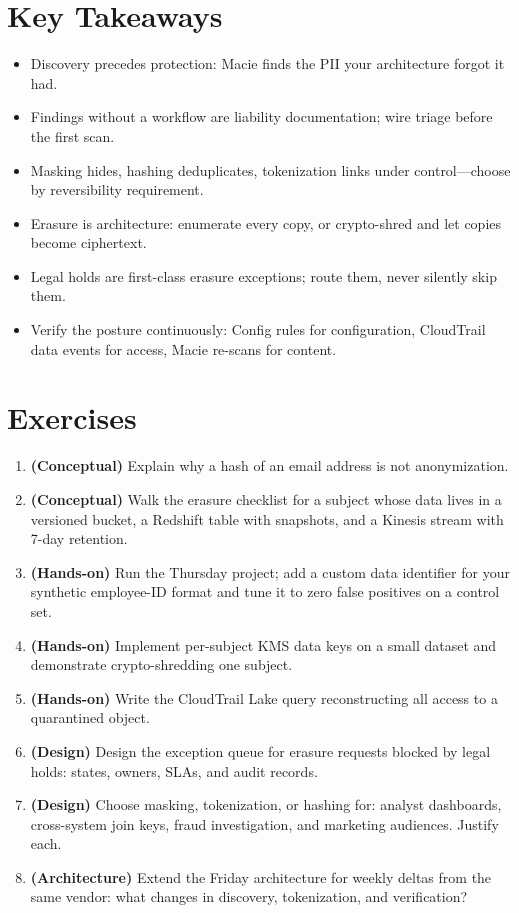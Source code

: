 \section*{Key Takeaways}
\begin{itemize}
    \item Discovery precedes protection: Macie finds the PII your architecture forgot it had.
    \item Findings without a workflow are liability documentation; wire triage before the first scan.
    \item Masking hides, hashing deduplicates, tokenization links under control---choose by reversibility requirement.
    \item Erasure is architecture: enumerate every copy, or crypto-shred and let copies become ciphertext.
    \item Legal holds are first-class erasure exceptions; route them, never silently skip them.
    \item Verify the posture continuously: Config rules for configuration, CloudTrail data events for access, Macie re-scans for content.
\end{itemize}

\section{Exercises}
\begin{enumerate}
    \item \textbf{(Conceptual)} Explain why a hash of an email address is not anonymization.
    \item \textbf{(Conceptual)} Walk the erasure checklist for a subject whose data lives in a versioned bucket, a Redshift table with snapshots, and a Kinesis stream with 7-day retention.
    \item \textbf{(Hands-on)} Run the Thursday project; add a custom data identifier for your synthetic employee-ID format and tune it to zero false positives on a control set.
    \item \textbf{(Hands-on)} Implement per-subject KMS data keys on a small dataset and demonstrate crypto-shredding one subject.
    \item \textbf{(Hands-on)} Write the CloudTrail Lake query reconstructing all access to a quarantined object.
    \item \textbf{(Design)} Design the exception queue for erasure requests blocked by legal holds: states, owners, SLAs, and audit records.
    \item \textbf{(Design)} Choose masking, tokenization, or hashing for: analyst dashboards, cross-system join keys, fraud investigation, and marketing audiences. Justify each.
    \item \textbf{(Architecture)} Extend the Friday architecture for weekly deltas from the same vendor: what changes in discovery, tokenization, and verification?
\end{enumerate}

